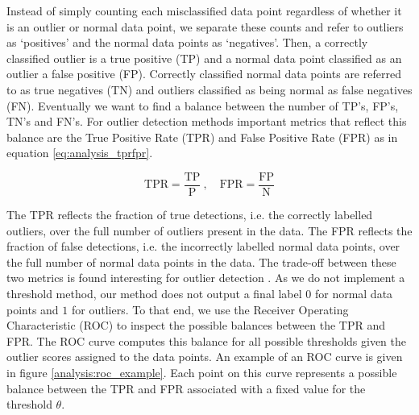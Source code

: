 Instead of simply counting each misclassified data point regardless of whether it is an outlier or normal data point, we separate these counts and refer to outliers as `positives' and the normal data points as `negatives'. Then, a correctly classified outlier is a true positive (TP) and a normal data point classified as an outlier a false positive (FP). Correctly classified normal data points are referred to as true negatives (TN) and outliers classified as being normal as false negatives (FN). 
Eventually we want to find a balance between the number of TP's, FP's, TN's and FN's. For outlier detection methods important metrics that reflect this balance are the True Positive Rate (TPR) and False Positive Rate (FPR) as in equation \eqref{eq:analysis_tprfpr}.

\begin{equation}\label{eq:analysis_tprfpr}
	\text{TPR} = \frac{\text{TP}}{\text{P}} \ , \quad \text{FPR} = \frac{\text{FP}}{\text{N}}
\end{equation}

The TPR reflects the fraction of true detections, i.e. the correctly labelled outliers, over the full number of outliers present in the data. The FPR reflects the fraction of false detections, i.e. the incorrectly labelled normal data points, over the full number of normal data points in the data. The trade-off between these two metrics is found interesting for outlier detection \cite{zimek2012survey}. As we do not implement a threshold method, our method does not output a final label $0$ for normal data points and $1$ for outliers. To that end, we use the Receiver Operating Characteristic (ROC) to inspect the possible balances between the TPR and FPR. The ROC curve computes this balance for all possible thresholds given the outlier scores assigned to the data points. An example of an ROC curve is given in figure \ref{analysis:roc_example}. Each point on this curve represents a possible balance between the TPR and FPR associated with a fixed value for the threshold $\theta$.

